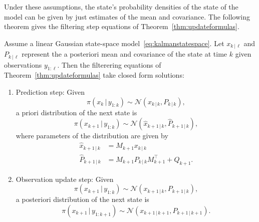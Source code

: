 Under these assumptions, the state's probability densities of the state of the model can be given by just estimates of the mean and covariance.
The following theorem gives the filtering step equations of Theorem~\ref{thm:updateformulas}.
\begin{theorem}\label{thm:kalmanfilterupdate}
    Assume a linear Gaussian state-space model~\eqref{eq:kalmanstatespace}.
    Let $x_{k\,\vert\,\ell}$ and $P_{k\,\vert\,\ell}$ represent the a posteriori mean and covariance of the state at time $k$ given observations $y_{1:\ell}$.
    Then the filterering equations of Theorem~\ref{thm:updateformulas} take closed form solutions:
    \begin{enumerate}
        \item 
            Prediction step:
            Given
            \begin{equation*}
                \pi (x_k \, \vert \, y_{1:k}) \sim \mathcal{N}(x_{k\,\vert\,k}, P_{k\,\vert\,k}),
            \end{equation*}
            a priori distribution of the next state is
            \begin{equation*}
                \pi (x_{k+1} \, \vert \,  y_{1:k}) \sim \mathcal{N}(\hat{x}_{k+1\,\vert\,k}, \hat{P}_{k+1\,\vert\,k}),
            \end{equation*}
            where parameters of the distribution are given by
            \begin{subequations}\label{eq:kalmanpredictionstep}
                \begin{align}
                    \hat{x}_{k+1\,\vert\,k} &= M_{k+1}x_{k\,\vert\,k}\\
                    \hat{P}_{k+1\,\vert\,k} &= M_{k+1}P_{k\,\vert\,k}M_{k+1}^{\top} + Q_{k+1}.
                \end{align}
            \end{subequations}
        \item
            Observation update step:
            Given
            \begin{equation*}
                \pi (x_{k+1} \, \vert \,  y_{1:k}) \sim \mathcal{N}(x_{k+1\,\vert\,k}, P_{k+1\,\vert\,k}),
            \end{equation*}
            a posteriori distribution of the next state is
            \begin{equation*}
                \pi (x_{k+1} \, \vert \,  y_{1:k+1}) \sim \mathcal{N}(x_{k+1\,\vert\,k+1}, P_{k+1\,\vert\,k+1}).
            \end{equation*}

\end{enumerate}
\end{theorem}

